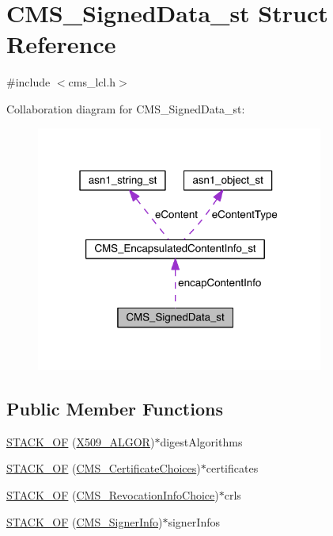 \hypertarget{struct_c_m_s___signed_data__st}{}\section{C\+M\+S\+\_\+\+Signed\+Data\+\_\+st Struct Reference}
\label{struct_c_m_s___signed_data__st}


{\ttfamily \#include $<$cms\+\_\+lcl.\+h$>$}



Collaboration diagram for C\+M\+S\+\_\+\+Signed\+Data\+\_\+st\+:\nopagebreak
\begin{figure}[H]
\begin{center}
\leavevmode
\includegraphics[width=268pt]{struct_c_m_s___signed_data__st__coll__graph}
\end{center}
\end{figure}
\subsection*{Public Member Functions}
\begin{DoxyCompactItemize}
\item 
\hyperlink{struct_c_m_s___signed_data__st_a013dcdf20ac610455bd558fdcf8fccf6}{S\+T\+A\+C\+K\+\_\+\+OF} (\hyperlink{crypto_2ossl__typ_8h_aa2b6185e6254f36f709cd6577fb5022e}{X509\+\_\+\+A\+L\+G\+OR})$\ast$digest\+Algorithms
\item 
\hyperlink{struct_c_m_s___signed_data__st_abd3c5f4b17e432e15afd93fcb46f6803}{S\+T\+A\+C\+K\+\_\+\+OF} (\hyperlink{struct_c_m_s___certificate_choices}{C\+M\+S\+\_\+\+Certificate\+Choices})$\ast$certificates
\item 
\hyperlink{struct_c_m_s___signed_data__st_aa370c4de1695c9482bdb8b0bfe230aa7}{S\+T\+A\+C\+K\+\_\+\+OF} (\hyperlink{crypto_2cms_2cms_8h_a9eeccd496bd97cbb41a8a045cae0548e}{C\+M\+S\+\_\+\+Revocation\+Info\+Choice})$\ast$crls
\item 
\hyperlink{struct_c_m_s___signed_data__st_a54a278cb414ca641dcc9d81bfaa124c2}{S\+T\+A\+C\+K\+\_\+\+OF} (\hyperlink{crypto_2cms_2cms_8h_a3f38c8c8e63c9af0a13f373f9f9df2f5}{C\+M\+S\+\_\+\+Signer\+Info})$\ast$signer\+Infos
\end{DoxyCompactItemize}
